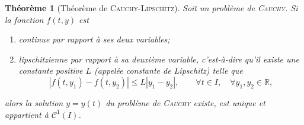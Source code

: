 \documentclass[a4paper,11pt]{article}
\theoremstyle{plain}
\newtheorem{thm}{Théorème}[section]
\theoremstyle{definition}
\theoremstyle{remark}
\newcommand{\ensemble}[1]{\mathbb{#1}}
\newcommand{\R}{\ensemble{R}}
\begin{document}
\begin{thm}[Théorème de \textsc{Cauchy}-\textsc{Lipschitz}]
Soit un problème de \textsc{Cauchy}. Si la fonction $f(t,y)$ est
\begin{enumerate}
\item continue par rapport à ses deux variables;
\item lipschitzienne par rapport à sa deuxième variable, c'est-à-dire qu'il existe une constante positive $L$ (appelée constante de Lipschitz) telle que
\[
|f(t, y_1 ) - f(t, y_2 )| \le L|y_1 - y_2 |,\qquad \forall t \in I,\quad \forall y_1,y_2 \in \R,
\]
\end{enumerate}
alors la solution $y = y(t)$ du problème de \textsc{Cauchy} existe, est unique et appartient à $\mathcal{C}^1(I)$.
\end{thm}
\end{document}

